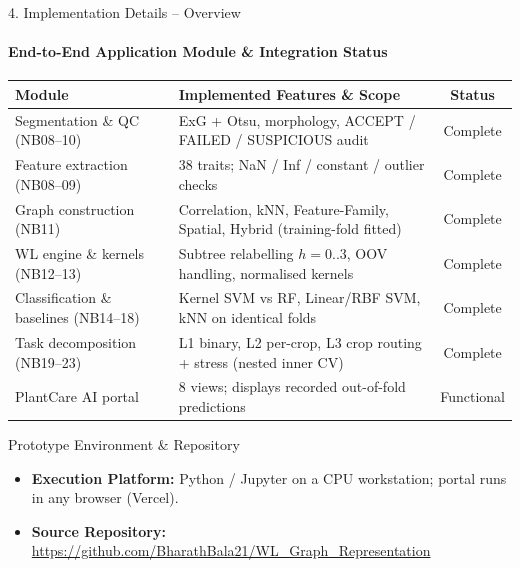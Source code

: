 \documentclass[aspectratio=169, 11pt]{beamer}
\begin{document}
\begin{frame}{4. Implementation Details -- Overview}
    \framesubtitle{End-to-End Application Module \& Integration Status}
    \begin{table}
        \centering
        \scriptsize
        \renewcommand{\arraystretch}{1.05}
        \begin{tabular}{L{4.2cm} L{7.6cm} c}
            \toprule
            \textbf{Module} & \textbf{Implemented Features \& Scope} & \textbf{Status} \\
            \midrule
            Segmentation \& QC (NB08--10) & ExG + Otsu, morphology, ACCEPT / FAILED / SUSPICIOUS audit & Complete \\
            Feature extraction (NB08--09) & 38 traits; NaN / Inf / constant / outlier checks & Complete \\
            Graph construction (NB11) & Correlation, kNN, Feature-Family, Spatial, Hybrid (training-fold fitted) & Complete \\
            WL engine \& kernels (NB12--13) & Subtree relabelling $h=0..3$, OOV handling, normalised kernels & Complete \\
            Classification \& baselines (NB14--18) & Kernel SVM vs RF, Linear/RBF SVM, kNN on identical folds & Complete \\
            Task decomposition (NB19--23) & L1 binary, L2 per-crop, L3 crop routing + stress (nested inner CV) & Complete \\
            PlantCare AI portal & 8 views; displays recorded out-of-fold predictions & Functional \\
            \bottomrule
        \end{tabular}
    \end{table}

    \begin{block}{Prototype Environment \& Repository}
        \scriptsize
        \begin{itemize}
            \item \textbf{Execution Platform:} Python / Jupyter on a CPU workstation; portal runs in any browser (Vercel).
            \item \textbf{Source Repository:} \url{https://github.com/BharathBala21/WL_Graph_Representation}
        \end{itemize}
    \end{block}
\end{frame}
\end{document}
